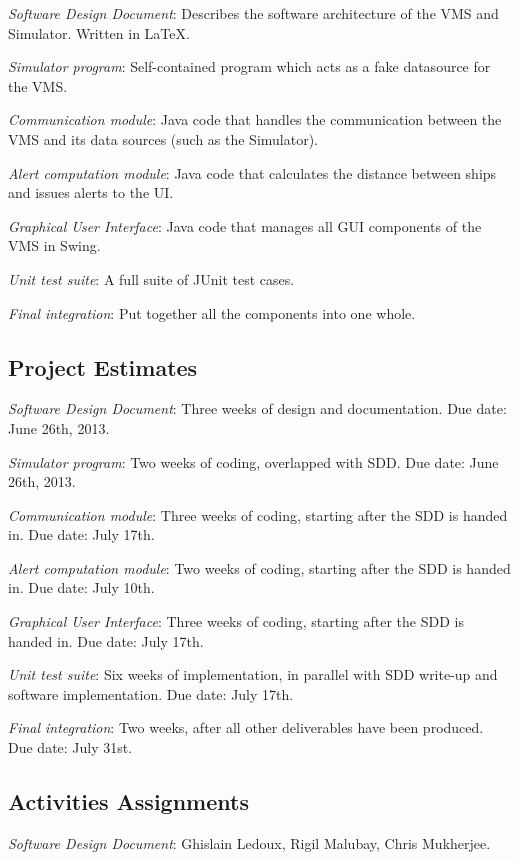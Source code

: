 \documentclass{article}
\begin{document}
\emph{Software Design Document}: Describes the software architecture of the VMS and Simulator. Written in \LaTeX. 

\emph{Simulator program}: Self-contained program which acts as a fake datasource for the VMS.

\emph{Communication module}: Java code that handles the communication between the VMS and its data sources (such as the Simulator). 

\emph{Alert computation module}: Java code that calculates the distance between ships and issues alerts to the UI.

\emph{Graphical User Interface}: Java code that manages all GUI components of the VMS in Swing.

\emph{Unit test suite}: A full suite of JUnit test cases.

\emph{Final integration}: Put together all the components into one whole.

\subsection{Project Estimates}

\emph{Software Design Document}: Three weeks of design and documentation. Due date: June 26th, 2013.

\emph{Simulator program}: Two weeks of coding, overlapped with SDD. Due date: June 26th, 2013.

\emph{Communication module}: Three weeks of coding, starting after the SDD is handed in. Due date: July 17th.

\emph{Alert computation module}: Two weeks of coding, starting after the SDD is handed in. Due date: July 10th.

\emph{Graphical User Interface}: Three weeks of coding, starting after the SDD is handed in. Due date: July 17th.

\emph{Unit test suite}: Six weeks of implementation, in parallel with SDD write-up and software implementation. Due date: July 17th.

\emph{Final integration}: Two weeks, after all other deliverables have been produced. Due date: July 31st.

\subsection{Activities Assignments}

\emph{Software Design Document}: Ghislain Ledoux, Rigil Malubay, Chris Mukherjee.
\end{document}
